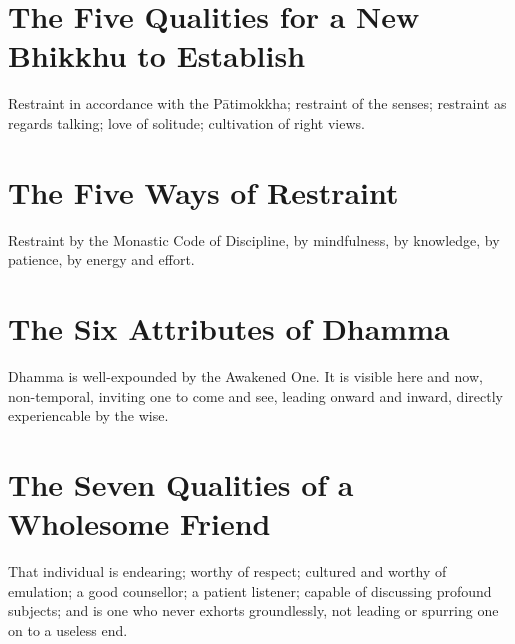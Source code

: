 \vspace*{-\baselineskip}

\section*{The Five Qualities for a New Bhikkhu to Establish}

Restraint in accordance with the Pātimokkha; restraint of the senses; restraint
as regards talking; love of solitude; cultivation of right views.


\section*{The Five Ways of Restraint}

Restraint by the Monastic Code of Discipline, by mindfulness, by knowledge, by
patience, by energy and effort.\\
\mbox{}

\vspace*{-\baselineskip}

\section*{The Six Attributes of Dhamma}

Dhamma is well-expounded by the Awakened One. It is visible here and now,
non-temporal, inviting one to come and see, leading onward and inward, directly
experiencable by the wise.\\
\mbox{}

\vspace*{-\baselineskip}

\section*{The Seven Qualities of a Wholesome Friend}


That individual is endearing; worthy of respect; cultured and worthy of
emulation; a good counsellor; a patient listener; capable of discussing profound
subjects; and is one who never exhorts groundlessly, not leading or spurring one
on to a useless end.\\
\mbox{}

\vspace*{-\baselineskip}

